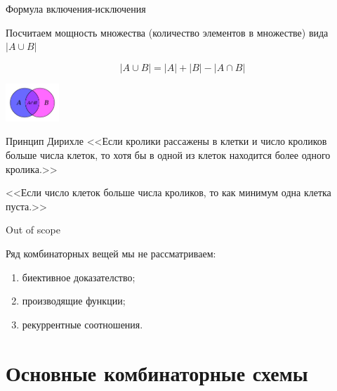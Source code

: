 \begin{frame}{Формула включения-исключения}


Посчитаем мощность множества (количество элементов в множестве)
вида $\left| A \cup B \right|$

\begin{equation}
\left| A \cup B \right| = \left|  A \right| + \left|  B \right| - \left| A \cap B \right|
\end{equation}

\centering
	\includegraphics[width=2cm]{../pic/A_intersect_B.svg.png}

\end{frame}

\begin{frame}{Принцип Дирихле}
<<Если кролики рассажены в клетки и число кроликов больше числа клеток, то хотя бы в одной из клеток находится более одного кролика.>>

<<Если число клеток больше числа кроликов, то как минимум одна клетка пуста.>>
\end{frame}

\begin{frame}{Out of scope}

Ряд комбинаторных вещей мы не рассматриваем:
\begin{enumerate}
	\item биективное доказателство; 
	\item производящие функции;
	\item рекуррентные соотношения.
\end{enumerate}

\end{frame}


\section{Основные комбинаторные схемы}\label{section:main_combinatorics_sxems}


